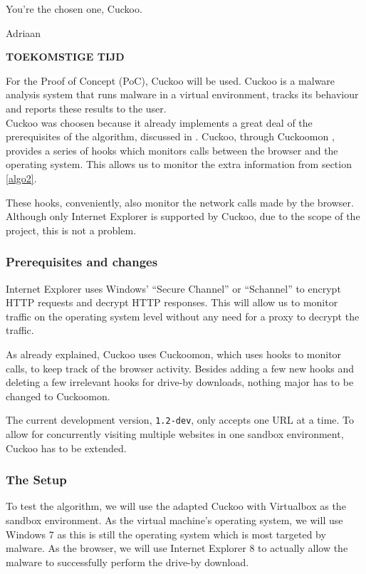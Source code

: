 \epigraph{You're the chosen one, Cuckoo.}{Adriaan}

\textbf{TOEKOMSTIGE TIJD}

For the Proof of Concept (PoC), Cuckoo \cite{cuckoo} will be used. Cuckoo is a malware analysis system that runs malware in a virtual environment, tracks its behaviour and reports these results to the user.\\

Cuckoo was choosen because it already implements a great deal of the prerequisites of the algorithm, discussed in . Cuckoo, through Cuckoomon \cite{cuckoomon}, provides a series of hooks which monitors calls between the browser and the operating system. This allows us to monitor the extra information from section \ref{algo2}. 

These hooks, conveniently, also monitor the network calls made by the browser. Although only Internet Explorer is supported by Cuckoo, due to the scope of the project, this is not a problem.

\subsubsection{Prerequisites and changes}

Internet Explorer uses Windows' ``Secure Channel'' or ``Schannel'' \cite{schannel} to encrypt HTTP requests and decrypt HTTP responses. This will allow us to monitor traffic on the operating system level without any need for a proxy to decrypt the traffic.

As already explained, Cuckoo uses Cuckoomon, which uses hooks to monitor calls, to keep track of the browser activity. Besides adding a few new hooks and deleting a few irrelevant hooks for drive-by downloads, nothing major has to be changed to Cuckoomon.

The current development version, \texttt{1.2-dev},  only accepts one URL at a time. To allow for concurrently visiting multiple websites in one sandbox environment, Cuckoo has to be extended.

\subsubsection{The Setup}

To test the algorithm, we will use the adapted Cuckoo with Virtualbox as the sandbox environment. As the virtual machine's operating system, we will use Windows 7 as this is still the operating system which is most targeted by malware. As the browser, we will use Internet Explorer 8 to actually allow the malware to successfully perform the drive-by download.

